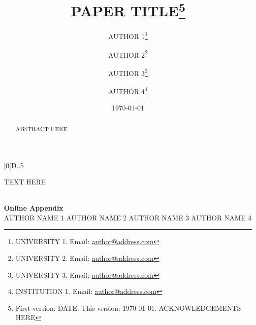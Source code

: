 

\usepackage{dcolumn}
\newcolumntype{d}[0]{D{.}{.}{5}}

\usepackage{graphicx}
\usepackage[space]{grffile}

 
\title{\textbf{\LARGE{PAPER TITLE}}\thanks{First version: DATE. This version: \today.  ACKNOWLEDGEMENTS HERE}}

\author{
	AUTHOR 1\thanks{UNIVERSITY 1. Email: \href{mailto:author@address.com}{author@address.com}} \and
	AUTHOR 2\thanks{UNIVERSITY 2. Email: \href{mailto:author@address.com}{author@address.com}} \and 
	AUTHOR 3\thanks{UNIVERSITY 3. Email: \href{mailto:author@address.com}{author@address.com}} \and 
	AUTHOR 4\thanks{INSTITUTION 1. Email: \href{mailto:author@address.com}{author@address.com}} 
	}
			
\date{\today}



\maketitle
\thispagestyle{empty} 
\setcounter{page}{0}

\begin{abstract}
ABSTRACT HERE

\end{abstract}


	  
	
\clearpage
TEXT HERE
\newpage
\singlespacing 

%

\onehalfspacing


%
%


\clearpage  
\appendix

\renewcommand{\thefigure}{A\arabic{figure}}
\setcounter{figure}{0}

\renewcommand{\thetable}{A\arabic{table}}
\setcounter{table}{0}


\clearpage
\begin{center}
\medskip \\
	\Large \textbf{Online Appendix} \bigskip \\
\large AUTHOR NAME 1 \hspace{0.3cm} AUTHOR NAME 2 \hspace{0.3cm} AUTHOR NAME 3 \hspace{0.3cm} AUTHOR NAME 4 \bigskip
	
\end{center}


%

%

%





